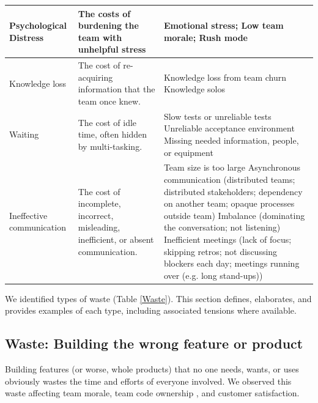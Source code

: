 \begin{table}[t]
\begin{tabular}{|p{1.5in}|p{1.9in}|p{3.2in}|}
Psychological Distress & The costs of burdening the team with unhelpful stress &  Emotional stress;  Low team morale; Rush mode
\\ \hline
Knowledge loss & The cost of re-acquiring information that the team once knew. & 
Knowledge loss from team churn \newline
Knowledge solos 
\\ \hline
Waiting                               & The cost of idle time, often hidden by multi-tasking. & Slow tests or unreliable tests \newline Unreliable acceptance environment \newline Missing  needed information, people, or equipment                                                                                                                                                                                                                                                                           \\ \hline
Ineffective communication             & The cost of incomplete, incorrect, misleading, inefficient, or absent communication.                         & 
Team size is too large \newline Asynchronous communication (distributed teams; distributed stakeholders; dependency on another team; opaque processes outside team) \newline Imbalance (dominating the conversation; not listening) \newline Inefficient meetings (lack of focus; skipping retros; not discussing blockers each day; meetings running over (e.g. long stand-ups)) \\ \hline                  
\end{tabular}
\end{table}




We identified \numberOfWastes{} types of waste (Table \ref{Waste}). This section defines, elaborates, and provides examples of each type, including associated tensions where available.
\subsection{Waste: Building the wrong feature or product}
Building features (or worse, whole products) that no one needs, wants, or uses obviously wastes the time and efforts of everyone involved. We observed this waste affecting team morale, team code ownership \cite{SedanoTeamCodeOwnership}, and customer satisfaction. 

